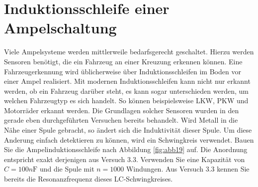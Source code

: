 \documentclass[10pt]{scrreprt}
\begin{document}
        \section{Induktionsschleife einer Ampelschaltung}
        Viele Ampelsysteme werden mittlerweile bedarfsgerecht geschaltet. Hierzu werden Sensoren
        benötigt, die ein Fahrzeug an einer Kreuzung erkennen können. Eine Fahrzeugerkennung
        wird üblicherweise über Induktionsschleifen im Boden vor einer Ampel realisiert. Mit
        modernen Induktionsschleifen kann nicht nur erkannt werden, ob ein Fahrzeug darüber
        steht, es kann sogar unterschieden werden, um welchen Fahrzeugtyp es sich handelt. So
        können beispielsweise LKW, PKW und Motorräder erkannt werden.
        Die Grundlagen solcher Sensoren wurden in den gerade eben durchgeführten Versuchen
        bereits behandelt. Wird Metall in die Nähe einer Spule gebracht, so ändert sich die
        Induktivität dieser Spule. Um diese Anderung einfach detektieren zu können, wird ein
        Schwingkreis verwendet.
        Bauen Sie die Ampelinduktionsschleife nach Abbildung \ref{fig:abb19} auf. Die Anordnung entspricht
        exakt derjenigen aus Versuch 3.3. Verwenden Sie eine Kapazität von $C = 100\si{n\farad}$ und die
        Spule mit $n = 1000$ Windungen. Aus Versuch 3.3 kennen Sie bereits die Resonanzfrequenz
        dieses LC-Schwingkreises.
\end{document}
